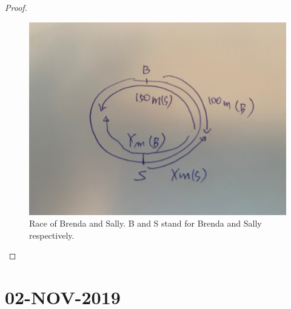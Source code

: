 \documentclass{article}
\begin{document}
\begin{itemize}
\begin{proof}
\begin{figure}
\begin{center}
\includegraphics[width=.5\linewidth]{figures/sally_and_brenda}
\caption{Race of Brenda and Sally. B and S stand for Brenda and Sally respectively.}
\label{fig:race}
\end{center}
\end{figure}

\end{proof}

\end{itemize}



\section{02-NOV-2019}
\end{document}
